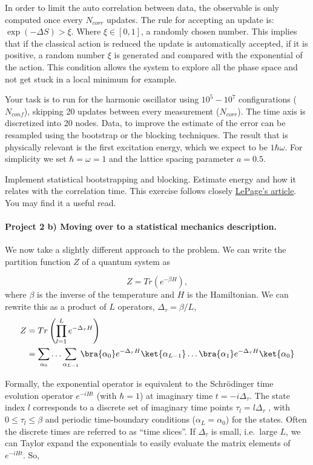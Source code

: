 \documentclass[%
oneside,                 %
final,                   %
10pt]{article}
\begin{document}
\noindent
In order to limit the auto correlation between data, the observable is
only computed once every $N_{corr}$ updates.  The rule for accepting
an update is: $\exp(-\Delta S) > \xi$. Where $\xi \in [0,1]$, a
randomly chosen number. This implies that if the classical action is
reduced the update is automatically accepted, if it is positive, a
random number $\xi$ is generated and compared with the exponential of
the action. This condition allows the system to explore all the phase
space and not get stuck in a local minimum for example.

Your task is to
run for the harmonic oscillator  using $10^5-10^7$ configurations ($N_{conf}$), skipping 20
updates between every measurement ($N_{corr}$). The time axis is
discretized into 20 nodes. Data, to improve the estimate of the error can be resampled using the bootstrap or the blocking
techniques.  The result that is physically relevant is the first
excitation energy, which we expect to be $1\hbar\omega$. For
simplicity we set $\hbar=\omega=1$ and the lattice spacing parameter
$a = 0.5$.

Implement statistical bootstrapping and blocking. 
Estimate energy and how it relates  with the correlation time. This exercise follows closely \href{{https://arxiv.org/pdf/hep-lat/0506036.pdf}}{LePage's article}. You may find it a useful read.

\paragraph{Project 2 b) Moving over to a statistical mechanics description.}
We now take a slightly different approach to the problem. We can write the partition function \(Z\) of a quantum system as 

\begin{equation*}
    Z = Tr(e^{-\beta H}),
\end{equation*}
where \(\beta\) is the inverse of the temperature and \(H\) is the Hamiltonian. We can rewrite this as a product of \(L\) operators, \(\Delta_\tau = \beta / L\),
\begin{align*}
    Z &= Tr\left(\prod_{l=1}^L e^{-\Delta_\tau H}\right) \\
    &= \sum_{\alpha_0} \hdots \sum_{\alpha_{L-1}} \bra{\alpha_0}  e^{-\Delta_\tau H} \ket{\alpha_{L-1}} \hdots \bra{\alpha_1} e^{-\Delta_\tau H} \ket{\alpha_0}
\end{align*}

Formally, the exponential operator is equivalent to the Schrödinger
time evolution operator \(e^{−iHt}\) (with \(\hbar = 1\)) at imaginary
time \(t = -i\Delta_\tau\). The state index \(l\) corresponds to a
discrete set of imaginary time points \(\tau_l = l \Delta_\tau\) ,
with \(0 \leq \tau_l \leq \beta\) and periodic time-boundary
conditions (\(\alpha_L = \alpha_0\)) for the states. Often the
discrete times are referred to as “time slices”. If \(\Delta_\tau\) is
small, i.e.~large \(L\), we can Taylor expand the exponentials to
easily evaluate the matrix elements of \(e^{−iHt}\). So,
\end{document}
